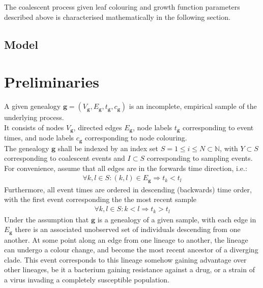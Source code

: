 \documentclass{report}
\newcommand{\N}{\mathbb{N}}
\theoremstyle{definition}
\begin{document}
The coalescent process given leaf colouring and growth function parameters described above is characterised mathematically in the following section.
\subsection{Model}
\section{Preliminaries}
A given genealogy $\mathbf{g}=(V_\mathbf{g}, E_\mathbf{g}, t_\mathbf{g}, c_\mathbf{g})$ is an incomplete, empirical sample of the underlying process.\\
It consists of nodes $V_\mathbf{g}$, directed edges $E_\mathbf{g}$, node labels $t_\mathbf{g}$ corresponding to event times, and node labels $c_\mathbf{g}$ corresponding to node colouring.\\
The genealogy $\mathbf{g}$ shall be indexed by an index set $S=1\leq i \leq N\subset \N$, with $Y\subset S$ corresponding to coalescent events and $I\subset S$ corresponding to sampling events.\\
For convenience, assume that all edges are in the forwards time direction, i.e.: 
\begin{gather*}
\forall k,l \in S: (k,l)\in E_\mathbf{g} \Rightarrow t_k<t_l
\end{gather*}
Furthermore, all event times are ordered in descending (backwards) time order, with the first event corresponding the the most recent sample
\begin{gather*}
\forall k,l \in S: k<l \Rightarrow t_k > t_l
\end{gather*}
Under the assumption that $\mathbf{g}$ is a genealogy of a given sample, with each edge in $E_\mathbf{g}$ there is an associated unobserved set of individuals descending from one another. At some point along an edge from one lineage to another, the lineage can undergo a colour change, and become the most recent ancestor of a diverging clade. This event corresponds to this lineage somehow gaining advantage over other lineages, be it a bacterium gaining resistance against a drug, or a strain of a virus invading a completely susceptible population.
\end{document}
